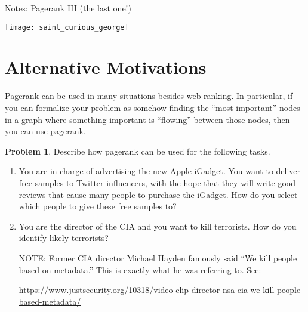\documentclass[10pt]{exam}
\theoremstyle{definition}
\newtheorem{problem}{Problem}
\begin{document}
\begin{center}
{
\Huge
    Notes: Pagerank III (the last one!)
}

\vspace{0.15in}
\texttt{[image: saint\_curious\_george]}
\vspace{-0.15in}

\end{center}

\begin{center}
\end{center}

\section{Alternative Motivations}

Pagerank can be used in many situations besides web ranking.
In particular, if you can formalize your problem as somehow finding the ``most important'' nodes in a graph where something important is ``flowing'' between those nodes,
then you can use pagerank.

\begin{problem}
    Describe how pagerank can be used for the following tasks.
    \begin{enumerate}
        \item 
            You are in charge of advertising the new Apple iGadget.
            You want to deliver free samples to Twitter influencers,
            with the hope that they will write good reviews that cause many people to purchase the iGadget.
            How do you select which people to give these free samples to?
            \newpage
        \item 
            You are the director of the CIA and you want to kill terrorists.
            How do you identify likely terrorists?


            \vspace{8in}
            NOTE:
            Former CIA director Michael Hayden famously said ``We kill people based on metadata.''
            This is exactly what he was referring to.
            See:

            \url{https://www.justsecurity.org/10318/video-clip-director-nsa-cia-we-kill-people-based-metadata/}
    \end{enumerate}
\end{problem}
\end{document}
